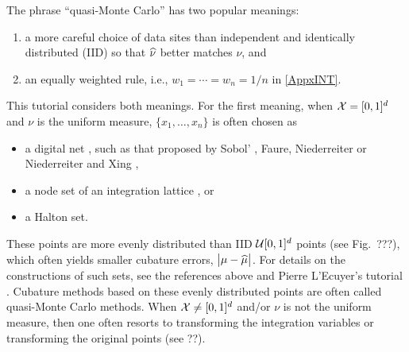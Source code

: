 \documentclass[graybox]{svmult}
\begin{document}
The phrase ``quasi-Monte Carlo'' has two popular meanings: 
\begin{enumerate}
\renewcommand{\labelenumi}{\roman{enumi})}
\item  a more careful choice of data sites than independent and identically distributed (IID) so that $\widehat{\nu}$ better matches $\nu$, and 
\item an equally weighted rule, i.e., $w_1 = \cdots = w_n = 1/n$ in \cref{AppxINT}.  
\end{enumerate}
This tutorial considers both meanings.   For the first meaning, when $\mathcal{X} = [0,1]^d$ and $\nu$ is the uniform measure, $\{x_1, \ldots, x_n\}$ is often chosen as 
\begin{itemize} 
\item a digital net \cite{DicPil10a}, such as that proposed by Sobol' \cite{}, Faure\cite{}, Niederreiter \cite{} or Niederreiter and Xing \cite{}, 
\item a node set of an integration lattice \cite{SloJoe94}, or 
\item a Halton set.  
\end{itemize}
These points are more evenly distributed than IID $\mathcal{U}[0,1]^d$ points (see Fig.\ ???), which often yields smaller cubature errors, $\bigl \lvert \mu - \widehat{\mu} \bigr \rvert$.  For details on the constructions of such sets, see the references above and Pierre L'Ecuyer's tutorial \cite{}.  Cubature methods based on these evenly distributed points are often called quasi-Monte Carlo methods.  When $\mathcal{X} \ne [0,1]^d$ and/or $\nu$ is not the uniform measure, then one often resorts to transforming the integration variables or transforming the original points (see ??).
\end{document}
